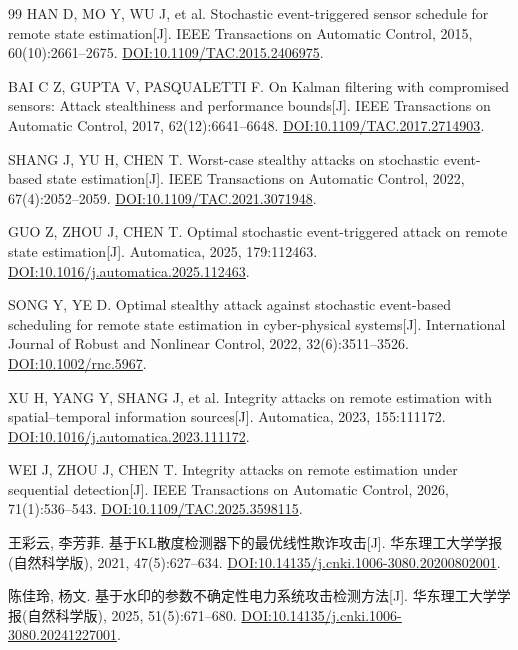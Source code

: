 \begin{thebibliography}{99}
HAN D, MO Y, WU J, et al. Stochastic event-triggered sensor schedule for remote state estimation[J].
IEEE Transactions on Automatic Control, 2015, 60(10):2661--2675.
\href{https://doi.org/10.1109/TAC.2015.2406975}{DOI:10.1109/TAC.2015.2406975}.

BAI C Z, GUPTA V, PASQUALETTI F. On Kalman filtering with compromised sensors: Attack stealthiness and performance bounds[J].
IEEE Transactions on Automatic Control, 2017, 62(12):6641--6648.
\href{https://doi.org/10.1109/TAC.2017.2714903}{DOI:10.1109/TAC.2017.2714903}.

SHANG J, YU H, CHEN T. Worst-case stealthy attacks on stochastic event-based state estimation[J].
IEEE Transactions on Automatic Control, 2022, 67(4):2052--2059.
\href{https://doi.org/10.1109/TAC.2021.3071948}{DOI:10.1109/TAC.2021.3071948}.

GUO Z, ZHOU J, CHEN T. Optimal stochastic event-triggered attack on remote state estimation[J].
Automatica, 2025, 179:112463.
\href{https://doi.org/10.1016/j.automatica.2025.112463}{DOI:10.1016/j.automatica.2025.112463}.

SONG Y, YE D. Optimal stealthy attack against stochastic event-based scheduling for remote state estimation in cyber-physical systems[J].
International Journal of Robust and Nonlinear Control, 2022, 32(6):3511--3526.
\href{https://doi.org/10.1002/rnc.5967}{DOI:10.1002/rnc.5967}.

XU H, YANG Y, SHANG J, et al. Integrity attacks on remote estimation with spatial--temporal information sources[J].
Automatica, 2023, 155:111172.
\href{https://doi.org/10.1016/j.automatica.2023.111172}{DOI:10.1016/j.automatica.2023.111172}.

WEI J, ZHOU J, CHEN T. Integrity attacks on remote estimation under sequential detection[J].
IEEE Transactions on Automatic Control, 2026, 71(1):536--543.
\href{https://doi.org/10.1109/TAC.2025.3598115}{DOI:10.1109/TAC.2025.3598115}.

王彩云, 李芳菲. 基于KL散度检测器下的最优线性欺诈攻击[J].
华东理工大学学报(自然科学版), 2021, 47(5):627--634.
\href{https://doi.org/10.14135/j.cnki.1006-3080.20200802001}{DOI:10.14135/j.cnki.1006-3080.20200802001}.

陈佳玲, 杨文. 基于水印的参数不确定性电力系统攻击检测方法[J].
华东理工大学学报(自然科学版), 2025, 51(5):671--680.
\href{https://doi.org/10.14135/j.cnki.1006-3080.20241227001}{DOI:10.14135/j.cnki.1006-3080.20241227001}.


\end{thebibliography}
